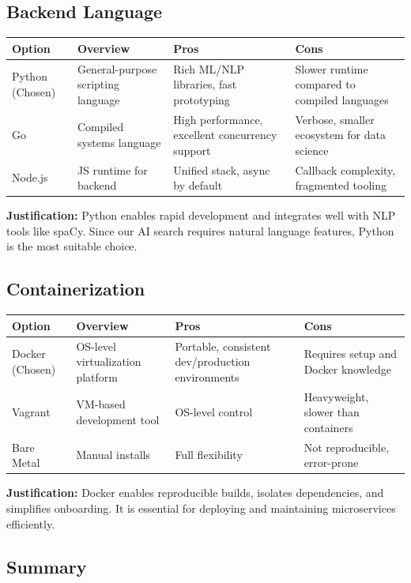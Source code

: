 \documentclass[12pt]{article}
\begin{document}
\subsection*{Backend Language}

\begin{tabular}{|p{3cm}|p{4cm}|p{4cm}|p{4cm}|}
\hline
\textbf{Option} & \textbf{Overview} & \textbf{Pros} & \textbf{Cons} \\
\hline
Python (Chosen) & General-purpose scripting language & Rich ML/NLP libraries, fast prototyping & Slower runtime compared to compiled languages \\
\hline
Go & Compiled systems language & High performance, excellent concurrency support & Verbose, smaller ecosystem for data science \\
\hline
Node.js & JS runtime for backend & Unified stack, async by default & Callback complexity, fragmented tooling \\
\hline
\end{tabular}
\newline
\textbf{Justification:} Python enables rapid development and integrates well with NLP tools like spaCy. Since our AI search requires natural language features, Python is the most suitable choice.

\subsection*{Containerization}

\begin{tabular}{|p{3cm}|p{4cm}|p{4cm}|p{4cm}|}
\hline
\textbf{Option} & \textbf{Overview} & \textbf{Pros} & \textbf{Cons} \\
\hline
Docker (Chosen) & OS-level virtualization platform & Portable, consistent dev/production environments & Requires setup and Docker knowledge \\
\hline
Vagrant & VM-based development tool & OS-level control & Heavyweight, slower than containers \\
\hline
Bare Metal & Manual installs & Full flexibility & Not reproducible, error-prone \\
\hline
\end{tabular}
\newline
\textbf{Justification:} Docker enables reproducible builds, isolates dependencies, and simplifies onboarding. It is essential for deploying and maintaining microservices efficiently.

\subsection*{Summary}
\end{document}

